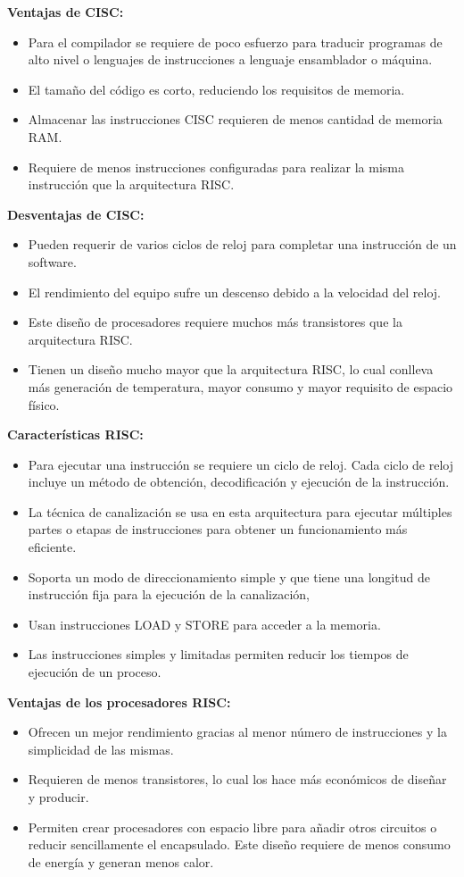 \documentclass[12pt,letterpaper]{article}
\begin{document}
\begin{enumerate}
  \textbf{Ventajas de CISC:}
  \begin{itemize}
  \item Para el compilador se requiere de poco esfuerzo para traducir programas de alto nivel o lenguajes de instrucciones a lenguaje ensamblador o máquina.
  \item El tamaño del código es corto, reduciendo los requisitos de memoria.
  \item Almacenar las instrucciones CISC requieren de menos cantidad de memoria RAM.
  \item Requiere de menos instrucciones configuradas para realizar la misma instrucción que la arquitectura RISC.
  \end{itemize}
  
  \textbf{Desventajas de CISC:}
  \begin{itemize}
  \item Pueden requerir de varios ciclos de reloj para completar una instrucción de un software.
  \item El rendimiento del equipo sufre un descenso debido a la velocidad del reloj.
  \item Este diseño de procesadores requiere muchos más transistores que la arquitectura RISC.
  \item Tienen un diseño mucho mayor que la arquitectura RISC, lo cual conlleva más generación de temperatura, mayor consumo y mayor requisito de espacio físico.
  \end{itemize}

  \textbf{Características RISC:}
  \begin{itemize}
  \item Para ejecutar una instrucción se requiere un ciclo de reloj. Cada ciclo de reloj incluye un método de obtención, decodificación y ejecución de la instrucción.
  \item La técnica de canalización se usa en esta arquitectura para ejecutar múltiples partes o etapas de instrucciones para obtener un funcionamiento más eficiente.
  \item Soporta un modo de direccionamiento simple y que tiene una longitud de instrucción fija para la ejecución de la canalización,
  \item Usan instrucciones LOAD y STORE para acceder a la memoria.
  \item Las instrucciones simples y limitadas permiten reducir los tiempos de ejecución de un proceso.
  \end{itemize}
  
  \textbf{Ventajas de los procesadores RISC:}
  \begin{itemize}
  \item Ofrecen un mejor rendimiento gracias al menor número de instrucciones y la simplicidad de las mismas.
  \item Requieren de menos transistores, lo cual los hace más económicos de diseñar y producir.
  \item Permiten crear procesadores con espacio libre para añadir otros circuitos o reducir sencillamente el encapsulado.
  Este diseño requiere de menos consumo de energía y generan menos calor.
  \end{itemize}
  

\end{enumerate}
\end{document}
